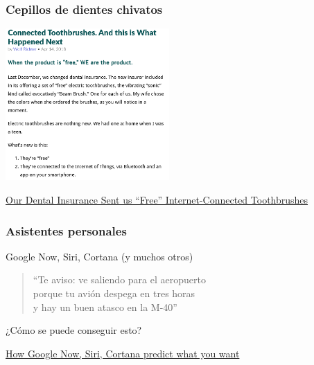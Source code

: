 \documentclass[17pt,aspectratio=169]{beamer}
\begin{document}
\begin{frame}
\frametitle{Cepillos de dientes chivatos}

\begin{center}
\includegraphics[height=5.8cm]{figs/toothbrushes}
\end{center}
\begin{flushright}
{\tiny \href{https://wolfstreet.com/2018/04/14/our-dental-insurance-sent-us-free-internet-connected-toothbrushes-and-this-is-what-happened-next/}{Our Dental Insurance Sent us “Free” Internet-Connected Toothbrushes}}
\end{flushright}

\end{frame}


\begin{frame}
\frametitle{Asistentes personales}

\begin{flushright}
  Google Now, Siri, Cortana (y muchos otros)
\end{flushright}

\begin{quote}
  ``Te aviso:
  ve saliendo para el aeropuerto \\
  porque tu avión despega en tres horas \\
  y hay un buen atasco en la M-40'' \\
\end{quote}

¿Cómo se puede conseguir esto?

\begin{flushright}
  {\tiny \href{http://searchengineland.com/how-google-now-siri-cortana-predict-what-you-want-229799}{How Google Now, Siri, Cortana predict what you want}}
\end{flushright}
\end{frame}
\end{document}
